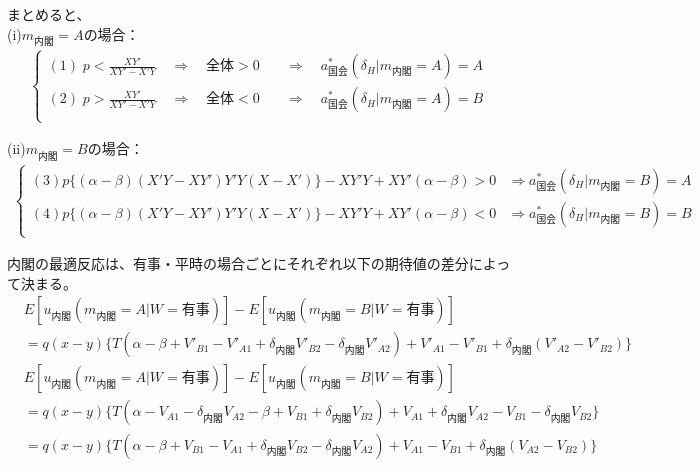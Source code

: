 \documentclass[main.tex]{subfiles}
\begin{document}
\bigskip
まとめると、\\
\noindent
(i)$m_{内閣}=A$の場合：
\begin{align*}
    \begin{cases}
        (1)\; p < \frac{XY'}{XY' - X'Y} \quad\Rightarrow\quad 全体>0 &\quad\Rightarrow\quad a^*_{国会}(\delta_H|m_{内閣} = A) = A\\[0.5em]
        (2)\; p > \frac{XY'}{XY' - X'Y} \quad\Rightarrow\quad 全体<0 &\quad\Rightarrow\quad a^*_{国会}(\delta_H|m_{内閣} = A) = B\\[0.5em] 
     \end{cases}
\end{align*}


\noindent
(ii)$m_{内閣}=B$の場合：
\begin{align*}
    \begin{cases}
        (3) p \{ (\alpha - \beta)( X'Y- XY')Y'Y(X - X')  \} -XY'Y + XY'(\alpha - \beta) > 0  &\Rightarrow a^*_{国会}(\delta_H|m_{内閣} = B) = A\\[0.5em]
        (4) p \{ (\alpha - \beta)( X'Y- XY')Y'Y(X - X')  \} -XY'Y + XY'(\alpha - \beta) < 0 &\Rightarrow a^*_{国会}(\delta_H|m_{内閣} = B) = B\\[0.5em] 
     \end{cases}
\end{align*}


内閣の最適反応は、有事・平時の場合ごとにそれぞれ以下の期待値の差分によって決まる。
\begin{align*}
    &E[u_{内閣}(m_{内閣}=A|W=有事)] - E[u_{内閣}(m_{内閣}=B|W=有事)] \\
    &= q(x-y) \lbrace T(\alpha-\beta + V'_{B1}-V'_{A1} + \delta_{内閣}V'_{B2} - \delta_{内閣}V'_{A2}) + V'_{A1} - V'_{B1} + \delta_{内閣}(V'_{A2} - V'_{B2})  \rbrace 
\end{align*}
\begin{align*}
    &E[u_{内閣}(m_{内閣}=A|W=有事)] - E[u_{内閣}(m_{内閣}=B|W=有事)] \\
    &= q(x-y)\lbrace T(\alpha -V_{A1} -\delta_{内閣}V_{A2} - \beta + V_{B1} + \delta_{内閣}V_{B2}) + V_{A1} + \delta_{内閣}V_{A2} - V_{B1} - \delta_{内閣}V_{B2}  \rbrace\\
    &= q(x-y)\lbrace T(\alpha - \beta + V_{B1}-V_{A1} + \delta_{内閣}V_{B2} -\delta_{内閣}V_{A2}   ) + V_{A1} - V_{B1} + \delta_{内閣}(V_{A2}  - V_{B2})  \rbrace
\end{align*}
\end{document}
